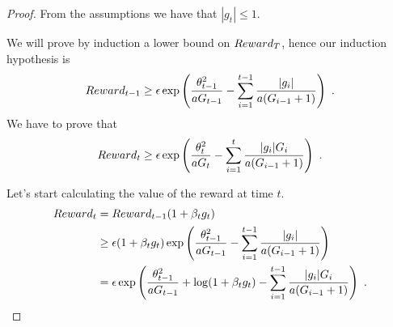 \begin{proof}
% 


From the assumptions we have that $|g_t|\leq 1$.

We will prove by induction a lower bound on $Reward_T$, hence our induction hypothesis is
\[
Reward_{t-1}\geq \epsilon \exp\left(\frac{\theta_{t-1}^2}{a G_{t-1}}- \sum_{i=1}^{t-1} \frac{|g_i|}{a (G_{i-1} + 1)}\right)~.
\]
We have to prove that 
\[
Reward_{t}\geq \epsilon \exp\left(\frac{\theta_{t}^2}{a G_t}- \sum_{i=1}^{t} \frac{|g_i| G_i}{a (G_{i-1} + 1)}\right)~.
\]

Let's start calculating the value of the reward at time $t$.
\begin{align*}
Reward_{t} &= Reward_{t-1} (1+\beta_t g_t) \\
&\geq \epsilon (1+\beta_t g_t)\exp\left(\frac{\theta_{t-1}^2}{a G_{t-1}}- \sum_{i=1}^{t-1} \frac{|g_i|}{a (G_{i-1} + 1) }\right) \\
&=  \epsilon \exp\left(\frac{\theta_{t-1}^2}{a G_{t-1}}+\log(1+\beta_t g_t)- \sum_{i=1}^{t-1} \frac{|g_i| G_i}{a (G_{i-1} + 1)}\right)~.
\end{align*}


\end{proof}
